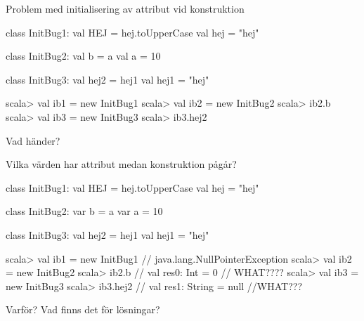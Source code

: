 \begin{Slide}{Problem med initialisering av attribut vid konstruktion}
\begin{Code}
class InitBug1:  
  val HEJ = hej.toUpperCase
  val hej = "hej"

class InitBug2:
  val b = a
  val a = 10

class InitBug3:
  val hej2 = hej1
  val hej1 = "hej"
\end{Code}
\begin{REPL}
scala> val ib1 = new InitBug1
scala> val ib2 = new InitBug2
scala> ib2.b
scala> val ib3 = new InitBug3
scala> ib3.hej2
\end{REPL}
Vad händer?

\end{Slide}


\begin{Slide}{Vilka värden har attribut medan konstruktion pågår?}
\begin{Code}
class InitBug1:  
  val HEJ = hej.toUpperCase
  val hej = "hej"

class InitBug2:
  var b = a
  var a = 10

class InitBug3:
  val hej2 = hej1
  val hej1 = "hej"
\end{Code}
\begin{REPL}
scala> val ib1 = new InitBug1   // java.lang.NullPointerException
scala> val ib2 = new InitBug2
scala> ib2.b                    // val res0: Int = 0  // WHAT????
scala> val ib3 = new InitBug3
scala> ib3.hej2                 // val res1: String = null  //WHAT???
\end{REPL}
Varför? Vad finns det för lösningar?

\end{Slide}

